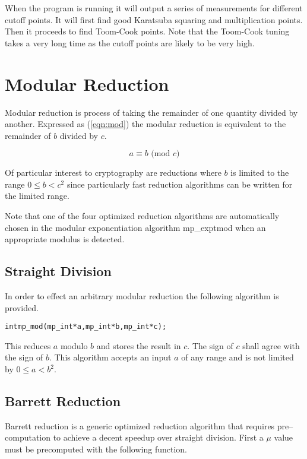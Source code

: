 \documentclass[synpaper]{book}
\begin{document}
When the program is running it will output a series of measurements for different cutoff points.  It will first find
good Karatsuba squaring and multiplication points.  Then it proceeds to find Toom-Cook points.  Note that the Toom-Cook
tuning takes a very long time as the cutoff points are likely to be very high.

\chapter{Modular Reduction}

Modular reduction is process of taking the remainder of one quantity divided by another.  Expressed
as (\ref{eqn:mod}) the modular reduction is equivalent to the remainder of $b$ divided by $c$.

\begin{equation}
a \equiv b \mbox{ (mod }c\mbox{)}
\label{eqn:mod}
\end{equation}

Of particular interest to cryptography are reductions where $b$ is limited to the range $0 \le b < c^2$ since particularly
fast reduction algorithms can be written for the limited range.

Note that one of the four optimized reduction algorithms are automatically chosen in the modular exponentiation
algorithm mp\_exptmod when an appropriate modulus is detected.

\section{Straight Division}
In order to effect an arbitrary modular reduction the following algorithm is provided.

\begin{alltt}
int mp_mod(mp_int *a, mp_int *b, mp_int *c);
\end{alltt}

This reduces $a$ modulo $b$ and stores the result in $c$.  The sign of $c$ shall agree with the sign
of $b$.  This algorithm accepts an input $a$ of any range and is not limited by $0 \le a < b^2$.

\section{Barrett Reduction}

Barrett reduction is a generic optimized reduction algorithm that requires pre--computation to achieve
a decent speedup over straight division.  First a $\mu$ value must be precomputed with the following function.
\end{document}
